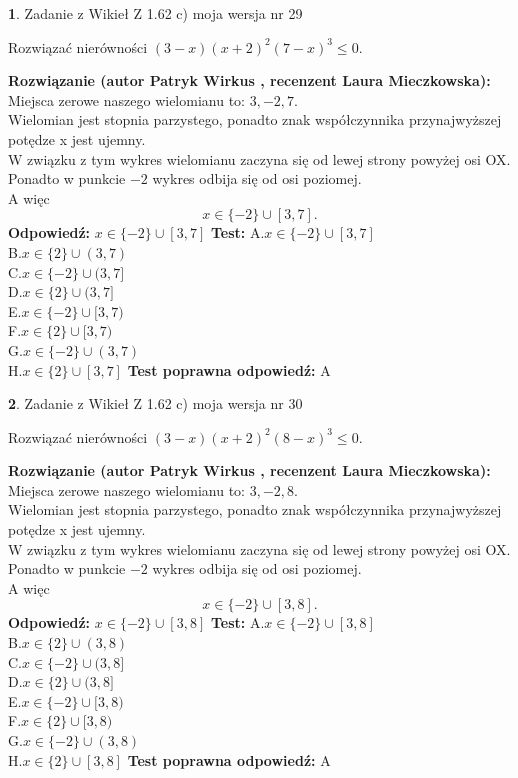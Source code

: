 \documentclass[12pt, a4paper]{article}
\theoremstyle{definition} %
\newtheorem{zad}{}
\newcommand{\zadStart}[1]{\begin{zad}#1\newline}
\newcommand{\zadStop}{\end{zad}}
\newcommand{\rozwStart}[2]{\noindent \textbf{Rozwiązanie (autor #1 , recenzent #2): }\newline}
\newcommand{\rozwStop}{\newline}
\newcommand{\odpStart}{\noindent \textbf{Odpowiedź:}\newline}
\newcommand{\odpStop}{\newline}
\newcommand{\testStart}{\noindent \textbf{Test:}\newline}
\newcommand{\testStop}{\newline}
\newcommand{\kluczStart}{\noindent \textbf{Test poprawna odpowiedź:}\newline}
\newcommand{\kluczStop}{\newline}
\begin{document}
\zadStart{Zadanie z Wikieł Z 1.62 c) moja wersja nr 29}

Rozwiązać nierówności $(3-x)(x+2)^{2}(7-x)^{3}\le0$.
\zadStop
\rozwStart{Patryk Wirkus}{Laura Mieczkowska}
Miejsca zerowe naszego wielomianu to: $3, -2, 7$.\\
Wielomian jest stopnia parzystego, ponadto znak współczynnika przy\linebreak najwyższej potędze x jest ujemny.\\ W związku z tym wykres wielomianu zaczyna się od lewej strony powyżej osi OX.\\
Ponadto w punkcie $-2$ wykres odbija się od osi poziomej.\\
A więc $$x \in \{-2\} \cup [3,7].$$
\rozwStop
\odpStart
$x \in \{-2\} \cup [3,7]$
\odpStop
\testStart
A.$x \in \{-2\} \cup [3,7]$\\
B.$x \in \{2\} \cup (3,7)$\\
C.$x \in \{-2\} \cup (3,7]$\\
D.$x \in \{2\} \cup (3,7]$\\
E.$x \in \{-2\} \cup [3,7)$\\
F.$x \in \{2\} \cup [3,7)$\\
G.$x \in \{-2\} \cup (3,7)$\\
H.$x \in \{2\} \cup [3,7]$
\testStop
\kluczStart
A
\kluczStop



\zadStart{Zadanie z Wikieł Z 1.62 c) moja wersja nr 30}

Rozwiązać nierówności $(3-x)(x+2)^{2}(8-x)^{3}\le0$.
\zadStop
\rozwStart{Patryk Wirkus}{Laura Mieczkowska}
Miejsca zerowe naszego wielomianu to: $3, -2, 8$.\\
Wielomian jest stopnia parzystego, ponadto znak współczynnika przy\linebreak najwyższej potędze x jest ujemny.\\ W związku z tym wykres wielomianu zaczyna się od lewej strony powyżej osi OX.\\
Ponadto w punkcie $-2$ wykres odbija się od osi poziomej.\\
A więc $$x \in \{-2\} \cup [3,8].$$
\rozwStop
\odpStart
$x \in \{-2\} \cup [3,8]$
\odpStop
\testStart
A.$x \in \{-2\} \cup [3,8]$\\
B.$x \in \{2\} \cup (3,8)$\\
C.$x \in \{-2\} \cup (3,8]$\\
D.$x \in \{2\} \cup (3,8]$\\
E.$x \in \{-2\} \cup [3,8)$\\
F.$x \in \{2\} \cup [3,8)$\\
G.$x \in \{-2\} \cup (3,8)$\\
H.$x \in \{2\} \cup [3,8]$
\testStop
\kluczStart
A
\kluczStop
\end{document}
